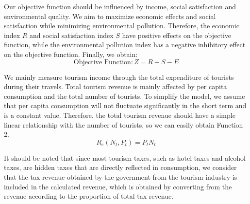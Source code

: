 \documentclass[12pt]{article}  %
\begin{document}
Our objective function should be influenced by income, social satisfaction and environmental quality. We aim to maximize economic effects and social satisfaction while minimizing environmental pollution. Therefore, the economic index $R$ and social satisfaction index $S$ have positive effects on the objective function, while the environmental pollution index has a negative inhibitory effect on the objective function. Finally, we obtain:
\begin{equation}
	\text{Objective\ Function}:Z=R+S-E
\end{equation}

We mainly measure tourism income through the total expenditure of tourists during their travels. Total tourism revenue is mainly affected by per capita consumption and the total number of tourists. To simplify the model, we assume that per capita consumption will not fluctuate significantly in the short term and is a constant value. Therefore, the total tourism revenue should have a simple linear relationship with the number of tourists, so we can easily obtain Function 2.
\begin{equation}
    R_{e}(N_{t},P_{t}) = P_{t}N_{t}
\end{equation}

It should be noted that since most tourism taxes, such as hotel taxes and alcohol taxes, are hidden taxes that are directly reflected in consumption, we consider that the tax revenue obtained by the government from the tourism industry is included in the calculated revenue, which is obtained by converting from the revenue according to the proportion of total tax revenue.
\end{document}
